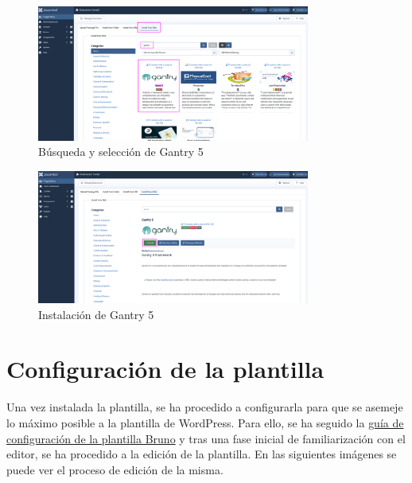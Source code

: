 \documentclass[a4paper]{article}
\begin{document}
\begin{figure}[H]
    \centering
    \includegraphics[width=0.8\textwidth]{images/gantry5-install-2.png}
    \caption{Búsqueda y selección de Gantry 5}
\end{figure}

\begin{figure}[H]
    \centering
    \includegraphics[width=0.8\textwidth]{images/gantry5-install-3.png}
    \caption{Instalación de Gantry 5}
\end{figure}


\section{Configuración de la plantilla}

Una vez instalada la plantilla, se ha procedido a configurarla para que se asemeje lo máximo posible a la plantilla de WordPress. Para ello, se ha seguido la \href{https://joomlead.com/documentation/bruno-documentation/}{guía de configuración de la plantilla Bruno} y tras una fase inicial de familiarización con el editor, se ha procedido a la edición de la plantilla. En las siguientes imágenes se puede ver el proceso de edición de la misma.
\end{document}
